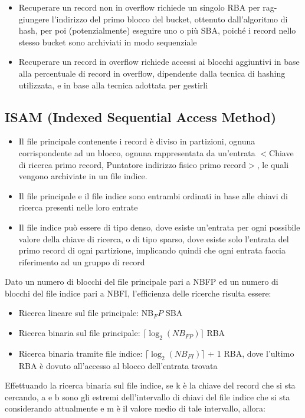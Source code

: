 \documentclass{article}
\begin{document}
\begin{itemize}
  \item Recuperare un record non in overflow richiede un singolo RBA per rag- giungere l'indirizzo del primo blocco del bucket, ottenuto dall'algoritmo di hash, per poi (potenzialmente) eseguire uno o più SBA, poiché i record nello stesso bucket sono archiviati in modo sequenziale
  \item Recuperare un record in overflow richiede accessi ai blocchi aggiuntivi in base alla percentuale di record in overflow, dipendente dalla tecnica di hashing utilizzata, e in base alla tecnica adottata per gestirli
\end{itemize}


\pagebreak


\subsection{ISAM (Indexed Sequential Access Method)}
\begin{itemize}
  \item Il file principale contenente i record è diviso in partizioni, ognuna corrispondente ad un blocco, ognuna rappresentata da un'entrata $<$Chiave di ricerca primo record, Puntatore indirizzo fisico primo record$>$, le quali vengono archiviate in un file indice.
  \item Il file principale e il file indice sono entrambi ordinati in base alle chiavi di ricerca presenti nelle loro entrate
  \item Il file indice può essere di tipo denso, dove esiste un'entrata per ogni possibile valore della chiave di ricerca, o di tipo sparso, dove esiste solo l'entrata del primo record di ogni partizione, implicando quindi che ogni entrata faccia riferimento ad un gruppo di record
\end{itemize}
Dato un numero di blocchi del file principale pari a NBFP ed un numero di blocchi del file indice pari a NBFI, l'efficienza delle ricerche risulta essere:
\begin{itemize}
  \item Ricerca lineare sul file principale: NB$_FP$ SBA
  \item Ricerca binaria sul file principale: $\lceil \log_2(NB_{FP}) \rceil
  $ RBA
  \item Ricerca binaria tramite file indice: $\lceil \log_2(NB_{FI}) \rceil
  $ + 1 RBA, dove l'ultimo RBA è dovuto all'accesso al blocco dell'entrata trovata
\end{itemize}
Effettuando la ricerca binaria sul file indice, se k è la chiave del record che si sta cercando, a e b sono gli estremi dell'intervallo di chiavi del file indice che si sta considerando attualmente e m è il valore medio di tale intervallo, allora:
\end{document}
